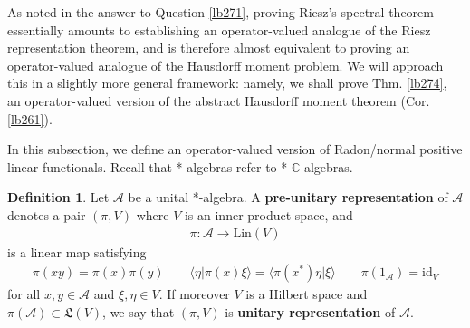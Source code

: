\documentclass[12pt,b5paper,notitlepage]{article}
\theoremstyle{definition}
\newtheorem{df}{Definition}[subsection]
\theoremstyle{plain}
\newcommand{\fk}{\mathfrak}
\newcommand{\id}{\mathrm{id}}
\newcommand{\bk}[1]{\langle {#1}\rangle}
\newcommand{\scr}{\mathscr}
\newcommand{\Cbb}{\mathbb C}
\newcommand{\Fbb}{\mathbb F}
\newcommand{\Lin}{\mathrm{Lin}}
\newcommand{\SA}{\mathscr A}
\numberwithin{equation}{section}
\begin{document}
\begin{comment}
\begin{df}
Let $\scr A$ and $\scr B$ be *-$\Fbb$-algebras. A linear map $\varphi:\scr A\rightarrow\scr B$ is called a \textbf{*-homomorphism} \index{00@*-homomorphism} if it satisfies
\begin{align*}
\varphi(xy)=\varphi(x)\varphi(y)\qquad\varphi(x^*)=\varphi(x)^*
\end{align*}
for all $x,y\in\scr A$. If $\scr A$ and $\scr B$ are both unital, a *-homomorphism $\varphi:\scr A\rightarrow\scr B$ is called \textbf{unital} \index{00@Unital *-homomorphism} if
\begin{align*}
\varphi(1_{\scr A})=1_{\scr B}
\end{align*}
\end{df}
\end{comment}


As noted in the answer to Question \ref{lb271}, proving Riesz's spectral theorem essentially amounts to establishing an operator-valued analogue of the Riesz representation theorem, and is therefore almost equivalent to proving an operator-valued analogue of the Hausdorff moment problem. We will approach this in a slightly more general framework: namely, we shall prove Thm. \ref{lb274}, an operator-valued version of the abstract Hausdorff moment theorem (Cor. \ref{lb261}).

In this subsection, we define an operator-valued version of Radon/normal positive linear functionals. Recall that *-algebras refer to *-$\Cbb$-algebras.


\begin{df}\label{lb347}
Let $\scr A$ be a unital *-algebra. A \textbf{pre-unitary representation} of $\scr A$  denotes a pair $(\pi,V)$ where $V$ is an inner product space, and
\begin{align*}
\pi:\scr A\rightarrow\Lin(V)
\end{align*}
is a linear map satisfying
\begin{align*}
\pi(xy)=\pi(x)\pi(y)\qquad\bk{\eta|\pi(x)\xi}=\bk{\pi(x^*)\eta|\xi}\qquad\pi(1_{\scr A})=\id_V
\end{align*}
for all $x,y\in\scr A$ and $\xi,\eta\in V$. If moreover $V$ is a Hilbert space and $\pi(\SA)\subset\fk L(V)$, we say that $(\pi,V)$ is \textbf{unitary representation} of $\scr A$. 
\end{df}

\end{document}
